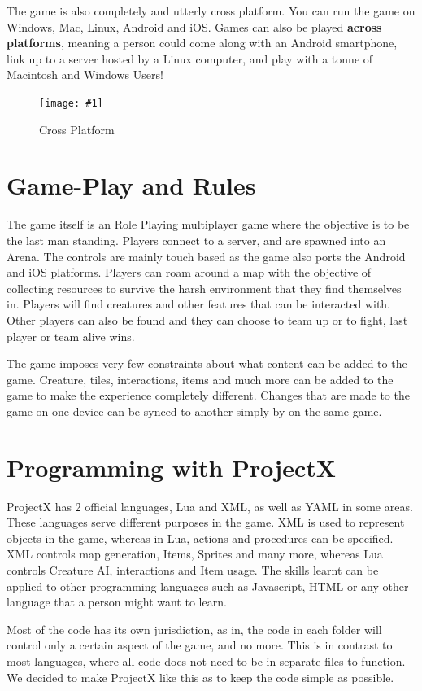 \documentclass{book}
\newcommand{\hFigure}[2]
	{\begin{figure}[ht!]
		\centering
		\texttt{[image: \#1]}
		\caption{#2}
	\end{figure}}
\begin{document}
	The game is also completely and utterly cross platform. You can run the game on Windows, Mac, Linux, Android and iOS. Games can also be played \textbf{across platforms}, meaning a person could come along with an Android smartphone, link up to a server hosted by a Linux computer, and play with a tonne of Macintosh and Windows Users!

	\hFigure{CrossPlatform.png}{Cross Platform}

	\section{Game-Play and Rules}
	The game itself is an Role Playing multiplayer game where the objective is to be the last man standing. Players connect to a server, and are spawned into an Arena. The controls are mainly touch based as the game also ports the Android and iOS platforms. Players can roam around a map with the objective of collecting resources to survive the harsh environment that they find themselves in. Players will find creatures and other features that can be interacted with. Other players can also be found and they can choose to team up or to fight, last player or team alive wins.
	
	The game imposes very few constraints about what content can be added to the game. Creature, tiles, interactions, items and much more can be added to the game to make the experience completely different. Changes that are made to the game on one device can be synced to another simply by on the same game.
	
	\section{Programming with ProjectX}
	ProjectX has 2 official languages, Lua and XML, as well as YAML in some areas. These languages serve different purposes in the game. XML is used to represent objects in the game, whereas in Lua, actions and procedures can be specified. XML controls map generation, Items, Sprites and many more, whereas Lua controls Creature AI, interactions and Item usage. The skills learnt can be applied to other programming languages such as Javascript, HTML or any other language that a person might want to learn.
	
	Most of the code has its own jurisdiction, as in, the code in each folder will control only a certain aspect of the game, and no more. This is in contrast to most languages, where all code does not need to be in separate files to function. We decided to make ProjectX like this as to keep the code simple as possible.
	
\end{document}

